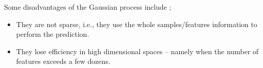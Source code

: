 \documentclass{article}
\begin{document}
Some disadvantages of the Gaussian process include \cite{scikit-learn};

\begin{itemize}
\item They are not sparse, i.e., they use the whole samples/features information to perform the prediction.
\item They lose efficiency in high dimensional spaces – namely when the number of features exceeds a few dozens.
\end{itemize}




\end{document}
